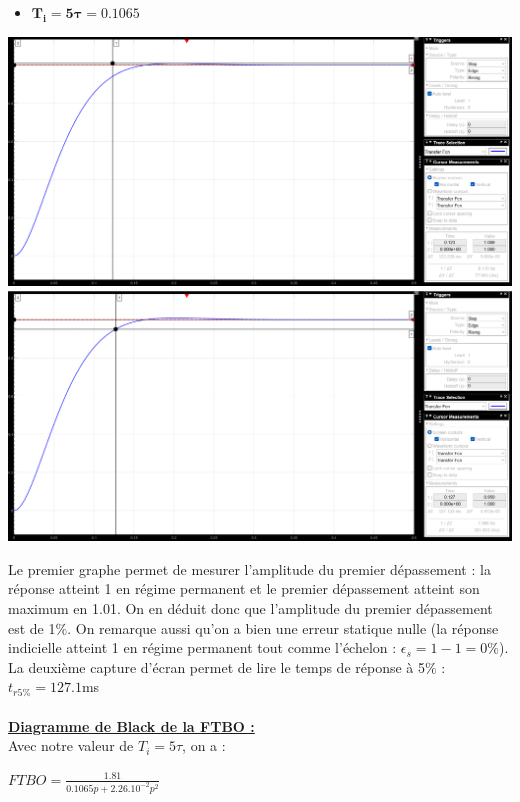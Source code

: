 \documentclass[12pt]{article}
\begin{document}
\begin{itemize}
    \item \large $\mathbf{T_i = 5\tau = 0.1065}$
\end{itemize}
\begin{center}
    \includegraphics[width = 16 cm]{TP2 Simulink/Syst_1/depassement_syst_1_Ti=5tau.png}
    \includegraphics[width = 16 cm]{TP2 Simulink/Syst_1/tr5prct_syst_1_Ti=5tau.png}
    
\end{center}
\normalsize Le premier graphe permet de mesurer l'amplitude du premier dépassement : la réponse atteint 1 en régime permanent et le premier dépassement atteint son maximum en 1.01. On en déduit donc que l'amplitude du premier dépassement est de 1$\%$.
On remarque aussi qu'on a bien une erreur statique nulle (la réponse indicielle atteint 1 en régime permanent tout comme l'échelon : $\epsilon_s = 1-1 = 0\%$).
La deuxième capture d'écran permet de lire le temps de réponse à 5$\%$ : $t_{r5\%} = 127.1$ms
\\\\\underline{\bf Diagramme de Black de la FTBO :}
\\\normalsize Avec notre valeur de $T_i = 5\tau$, on a :
\begin{center}
    \large$FTBO = \frac{1.81}{0.1065p + 2.26.10^{-2}p^2}$
\end{center}
\end{document}
